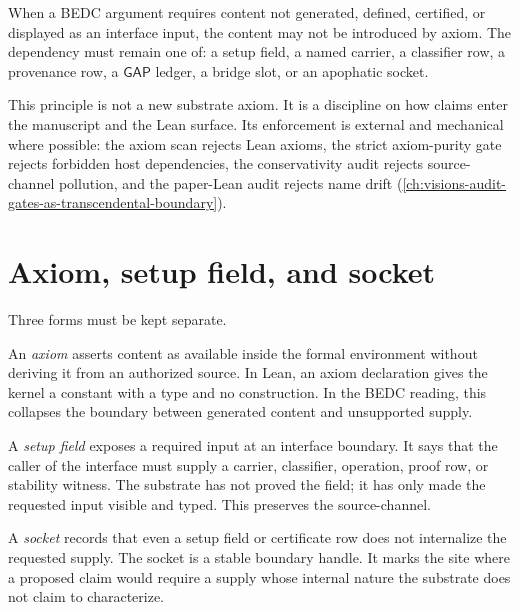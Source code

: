 \begin{principle}
\label{prin:external-supply-no-internalization}
When a BEDC argument requires content not generated, defined, certified, or displayed as an interface input, the content may not be introduced by axiom. The dependency must remain one of: a setup field, a named carrier, a classifier row, a provenance row, a $\mathsf{GAP}$ ledger, a bridge slot, or an apophatic socket.
\end{principle}

This principle is not a new substrate axiom. It is a discipline on how claims enter the manuscript and the Lean surface. Its enforcement is external and mechanical where possible: the axiom scan rejects Lean axioms, the strict axiom-purity gate rejects forbidden host dependencies, the conservativity audit rejects source-channel pollution, and the paper-Lean audit rejects name drift (\autoref{ch:visions-audit-gates-as-transcendental-boundary}).

\section{Axiom, setup field, and socket}
\label{sec:external-supply-axiom-setup-socket}

Three forms must be kept separate.

An \emph{axiom} asserts content as available inside the formal environment without deriving it from an authorized source. In Lean, an axiom declaration gives the kernel a constant with a type and no construction. In the BEDC reading, this collapses the boundary between generated content and unsupported supply.

A \emph{setup field} exposes a required input at an interface boundary. It says that the caller of the interface must supply a carrier, classifier, operation, proof row, or stability witness. The substrate has not proved the field; it has only made the requested input visible and typed. This preserves the source-channel.

A \emph{socket} records that even a setup field or certificate row does not internalize the requested supply. The socket is a stable boundary handle. It marks the site where a proposed claim would require a supply whose internal nature the substrate does not claim to characterize.

